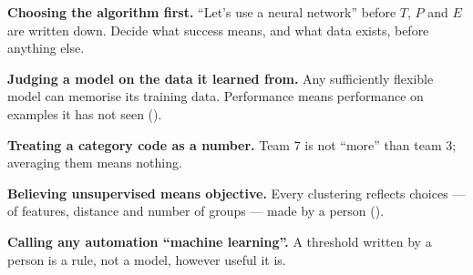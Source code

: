 \begin{pitfall}
\begin{tight}
  \item \textbf{Choosing the algorithm first.} ``Let's use a neural network''
        before $T$, $P$ and $E$ are written down. Decide what success means, and
        what data exists, before anything else.
  \item \textbf{Judging a model on the data it learned from.} Any sufficiently
        flexible model can memorise its training data. Performance means
        performance on examples it has not seen ().
  \item \textbf{Treating a category code as a number.} Team 7 is not ``more''
        than team 3; averaging them means nothing.
  \item \textbf{Believing unsupervised means objective.} Every clustering
        reflects choices --- of features, distance and number of groups --- made
        by a person ().
  \item \textbf{Calling any automation ``machine learning''.} A threshold
        written by a person is a rule, not a model, however useful it is.
\end{tight}
\end{pitfall}

